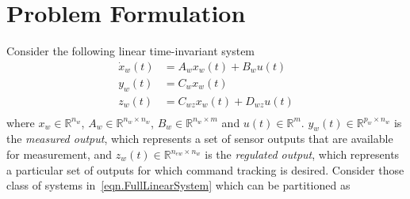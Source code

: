 \section{Problem Formulation}

Consider the following linear time-invariant system
\begin{equation}
  \label{eqn.FullLinearSystem}
  \begin{split}
    \dot{x}_{w}(t) &= A_{w}x_{w}(t) + B_{w}u(t) \\
    y_{w}(t) &= C_{w}x_{w}(t) \\
    z_{w}(t) &= C_{wz}x_{w}(t) + D_{wz}u(t) \\
  \end{split}
\end{equation}
where $x_{w}\in\mathbb{R}^{n_{w}}$, $A_{w}\in\mathbb{R}^{n_{w}\times n_{w}}$, $B_{w}\in\mathbb{R}^{n_{w}\times m}$ and $u(t)\in\mathbb{R}^{m}$.
$y_{w}(t)\in\mathbb{R}^{p_{w}\times n_{w}}$ is the \textit{measured output}, which represents a set of sensor outputs that are available for measurement, and $z_{w}(t)\in\mathbb{R}^{n_{ew}\times n_{w}}$ is the \textit{regulated output}, which represents a particular set of outputs for which command tracking is desired.
Consider those class of systems in\ \eqref{eqn.FullLinearSystem} which can be partitioned as
